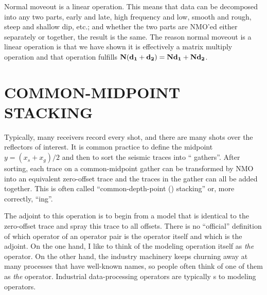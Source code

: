 \par
Normal moveout is a linear operation.
This means that data can be decomposed into any two parts,
early and late,
high frequency and low,
smooth and rough,
steep and shallow dip, etc.;
and whether the two parts
are NMO'ed either separately or together, the result is the same.
The reason normal moveout is a linear operation
is that we have shown it is effectively a matrix multiply operation
and that operation fulfills ${\bf N(d_1+d_2) = Nd_1+Nd_2}$.

\section{COMMON-MIDPOINT STACKING}
Typically, many receivers record every shot, and there are many shots
over the reflectors of interest.
It is common practice to define 
the midpoint $y =(x_s+x_g)/2$ and then to sort the
seismic traces into `` gathers''.
After sorting,
each trace on a common-midpoint gather can be transformed by NMO
into an equivalent zero-offset trace
and the traces in the gather can all be added together.
This is often called ``common-depth-point () stacking'' 
or, more correctly, ``ing''.

\par
The adjoint to this operation is to begin from
a model that is identical to the zero-offset trace
and spray this trace to all offsets.
There is no ``official'' definition
of which operator of an operator pair is the operator itself
and which is the adjoint.
On the one hand, I like to think of the modeling operation itself
as {\em  the} operator.
On the other hand,
the industry machinery keeps churning away at many processes
that have well-known names,
so people often think of one of them as {\em  the} operator.
Industrial data-processing operators are typically
s
to modeling operators.

